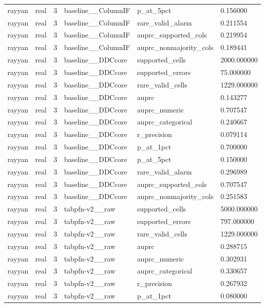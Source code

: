 \begin{tabular}{llllll}
rayyan & real & 3 & baseline\_\_ColumnIF & p\_at\_5pct & 0.156000 \\
rayyan & real & 3 & baseline\_\_ColumnIF & rare\_valid\_alarm & 0.211554 \\
rayyan & real & 3 & baseline\_\_ColumnIF & auprc\_supported\_cols & 0.219954 \\
rayyan & real & 3 & baseline\_\_ColumnIF & auprc\_nonmajority\_cols & 0.189441 \\
rayyan & real & 3 & baseline\_\_DDCcore & supported\_cells & 2000.000000 \\
rayyan & real & 3 & baseline\_\_DDCcore & supported\_errors & 75.000000 \\
rayyan & real & 3 & baseline\_\_DDCcore & rare\_valid\_cells & 1229.000000 \\
rayyan & real & 3 & baseline\_\_DDCcore & auprc & 0.143277 \\
rayyan & real & 3 & baseline\_\_DDCcore & auprc\_numeric & 0.707547 \\
rayyan & real & 3 & baseline\_\_DDCcore & auprc\_categorical & 0.240667 \\
rayyan & real & 3 & baseline\_\_DDCcore & r\_precision & 0.079114 \\
rayyan & real & 3 & baseline\_\_DDCcore & p\_at\_1pct & 0.700000 \\
rayyan & real & 3 & baseline\_\_DDCcore & p\_at\_5pct & 0.150000 \\
rayyan & real & 3 & baseline\_\_DDCcore & rare\_valid\_alarm & 0.296989 \\
rayyan & real & 3 & baseline\_\_DDCcore & auprc\_supported\_cols & 0.707547 \\
rayyan & real & 3 & baseline\_\_DDCcore & auprc\_nonmajority\_cols & 0.251583 \\
rayyan & real & 3 & tabpfn-v2\_\_raw & supported\_cells & 5000.000000 \\
rayyan & real & 3 & tabpfn-v2\_\_raw & supported\_errors & 797.000000 \\
rayyan & real & 3 & tabpfn-v2\_\_raw & rare\_valid\_cells & 1229.000000 \\
rayyan & real & 3 & tabpfn-v2\_\_raw & auprc & 0.288715 \\
rayyan & real & 3 & tabpfn-v2\_\_raw & auprc\_numeric & 0.302931 \\
rayyan & real & 3 & tabpfn-v2\_\_raw & auprc\_categorical & 0.330657 \\
rayyan & real & 3 & tabpfn-v2\_\_raw & r\_precision & 0.267932 \\
rayyan & real & 3 & tabpfn-v2\_\_raw & p\_at\_1pct & 0.080000 \\

\end{tabular}
